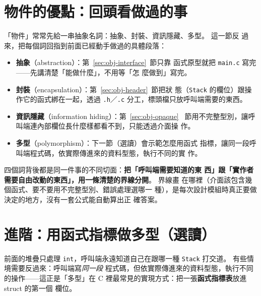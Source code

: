 \section{物件的優點：回頭看做過的事}
\label{sec:obj-summary}

「物件」常常先給一串抽象名詞：抽象、封裝、資訊隱藏、多型。 這一節反
過來，把每個詞回指到前面已經動手做過的具體段落：

\begin{itemize}
\item \textbf{抽象}（abstraction）：第~\ref{sec:obj-interface}~節只靠
函式原型就把 \texttt{main.c} 寫完——先講清楚「能做什麼」，不用等「怎
麼做到」寫完。
\item \textbf{封裝}（encapsulation）：第~\ref{sec:obj-header}~節把狀
態（\texttt{Stack} 的欄位）跟操作它的函式綁在一起，透過
\texttt{.h}／\texttt{.c} 分工，標頭檔只放呼叫端需要的東西。
\item \textbf{資訊隱藏}（information hiding）：第~\ref{sec:obj-opaque}~
節用不完整型別，讓呼叫端連內部欄位長什麼樣都看不到，只能透過介面操
作。
\item \textbf{多型}（polymorphism）：下一節（選讀）會示範怎麼用函式
指標，讓同一段呼叫端程式碼，依實際傳進來的資料型態，執行不同的實
作。
\end{itemize}

四個詞背後都是同一件事的不同切面：\textbf{把「呼叫端需要知道的東
西」跟「實作者需要自由改動的東西」，用一條清楚的界線分開}。 界線畫
在哪裡（介面該包含幾個函式、要不要用不完整型別、錯誤處理選哪一
種），是每次設計模組時真正要做決定的地方，沒有一套公式能自動算出正
確答案。


\section{進階：用函式指標做多型（選讀）}
\label{sec:obj-polymorphism}

前面的堆疊只處理 \texttt{int}，呼叫端永遠知道自己在跟哪一種
\texttt{Stack} 打交道。 有些情境需要反過來：呼叫端寫\textit{同一段}
程式碼，但依實際傳進來的資料型態，執行不同的操作——這正是「多型」在
C 裡最常見的實現方式：把一張\textbf{函式指標表}放進 struct 的第一個
欄位。


